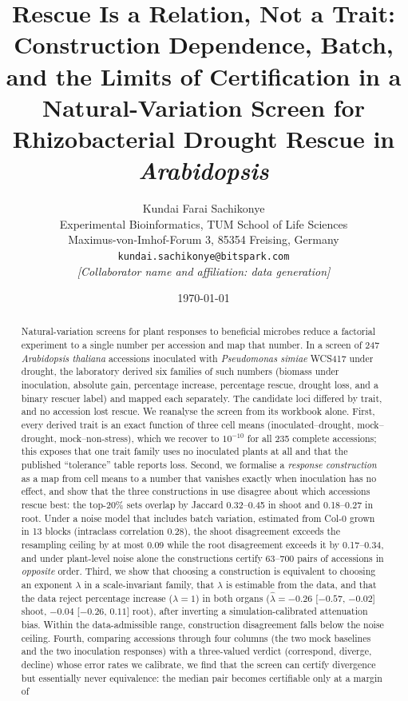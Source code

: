\documentclass[10pt,twocolumn,a4paper]{article}
\title{\textbf{Rescue Is a Relation, Not a Trait: \\
Construction Dependence, Batch, and the Limits of Certification in a
Natural-Variation Screen for Rhizobacterial Drought Rescue in
\emph{Arabidopsis}}}
\author{%
Kundai Farai Sachikonye\\[0.2em]
\normalsize Experimental Bioinformatics, TUM School of Life Sciences\\
\normalsize Maximus-von-Imhof-Forum 3, 85354 Freising, Germany\\
\normalsize \texttt{kundai.sachikonye@bitspark.com}\\[0.6em]
\normalsize \textit{[Collaborator name and affiliation: data generation]}}
\date{\today}
\theoremstyle{definition}
\theoremstyle{remark}
\newcommand{\lamhat}{\hat\lambda}
\begin{document}
\maketitle

\begin{abstract}
\noindent
Natural-variation screens for plant responses to beneficial microbes
reduce a factorial experiment to a single number per accession and map
that number. In a screen of 247 \emph{Arabidopsis thaliana} accessions
inoculated with \emph{Pseudomonas simiae} WCS417 under drought, the
laboratory derived six families of such numbers (biomass under
inoculation, absolute gain, percentage increase, percentage rescue,
drought loss, and a binary rescuer label) and mapped each separately.
The candidate loci differed by trait, and no accession lost rescue. We
reanalyse the screen from its workbook alone. First, every derived trait
is an exact function of three cell means (inoculated--drought, mock--drought,
mock--non-stress), which we recover to $10^{-10}$ for all 235 complete
accessions; this exposes that one trait family uses no inoculated plants
at all and that the published ``tolerance'' table reports loss. Second,
we formalise a \emph{response construction} as a map from cell means to a
number that vanishes exactly when inoculation has no effect, and show
that the three constructions in use disagree about which accessions
rescue best: the top-20\% sets overlap by Jaccard 0.32--0.45 in shoot and
0.18--0.27 in root. Under a noise model that includes batch variation,
estimated from Col-0 grown in 13 blocks (intraclass correlation 0.28),
the shoot disagreement exceeds the resampling ceiling by at most 0.09
while the root disagreement exceeds it by 0.17--0.34, and under
plant-level noise alone the constructions
certify 63--700 pairs of accessions in \emph{opposite} order. Third, we
show that choosing a construction is equivalent to choosing an exponent
$\lambda$ in a scale-invariant family, that $\lambda$ is estimable from
the data, and that the data reject percentage increase ($\lambda=1$) in
both organs ($\lamhat=-0.26$ [$-0.57$, $-0.02$] shoot, $-0.04$ [$-0.26$,
$0.11$] root), after inverting a simulation-calibrated attenuation bias.
Within the data-admissible range, construction disagreement falls below
the noise ceiling. Fourth, comparing accessions through four columns (the
two mock baselines and the two inoculation responses) with a three-valued
verdict (correspond, diverge, decline) whose error rates we calibrate,
we find that the screen can certify divergence but essentially never
equivalence: the median pair becomes certifiable only at a margin of

\end{abstract}
\end{document}
